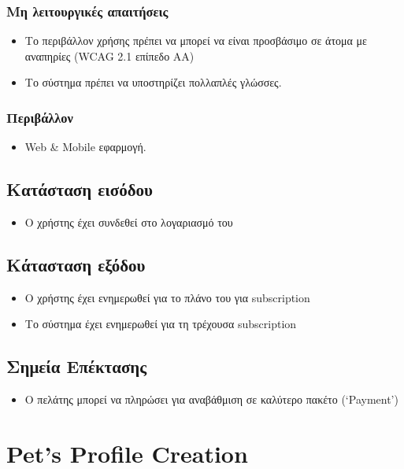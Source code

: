 \documentclass[12pt,a4paper,twoside]{book}
\begin{document}
\subsubsection{Μη λειτουργικές απαιτήσεις}
\begin{itemize}
  \item Το περιβάλλον χρήσης πρέπει να μπορεί να  είναι προσβάσιμο σε  άτομα με αναπηρίες (WCAG 2.1 επίπεδο AA) %
  \item Το σύστημα πρέπει να υποστηρίζει πολλαπλές γλώσσες.
\end{itemize}

\subsubsection{Περιβάλλον}
\begin{itemize}
  \item Web \& Mobile εφαρμογή.
\end{itemize}

\subsection{Κατάσταση εισόδου} %
\begin{itemize}
  \item Ο χρήστης έχει συνδεθεί στο λογαριασμό του %
\end{itemize}

\subsection{Κάτασταση εξόδου} %
\begin{itemize}
  \item Ο χρήστης έχει ενημερωθεί για το πλάνο του για subscription
  \item Το σύστημα έχει ενημερωθεί για τη τρέχουσα subscription
\end{itemize}

\subsection{Σημεία Επέκτασης}
\begin{itemize}
  \item Ο πελάτης μπορεί να πληρώσει για αναβάθμιση σε καλύτερο πακέτο (`Payment') %
\end{itemize}

\section{Pet's Profile Creation} %
\end{document}
